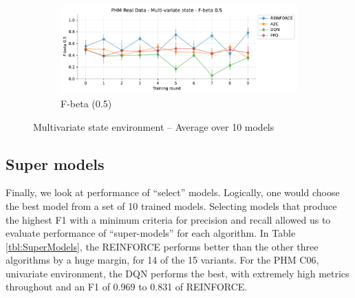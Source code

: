 \documentclass[a4paper, 12pt]{article}
\begin{document}
\begin{figure}[ht]
	\begin{subfigure}{\textwidth}
		\centering
		\includegraphics[width=\linewidth]{Multivariate_F05.pdf}  
		\caption{F-beta (0.5)}
		\label{fig:tr-ms-f05}
	\end{subfigure}
	\caption{Multivariate state environment -- Average over 10 models}
	\label{fig:tr-ms-env}
\end{figure}

\subsection{Super models}
Finally, we look at performance of ``select'' models. Logically, one would choose the best model from a set of 10 trained models. Selecting models that produce the highest F1 with a minimum criteria for precision and recall allowed us to evaluate performance of ``super-models'' for each algorithm. In Table \ref{tbl:SuperModels}, the REINFORCE performs better than the other three algorithms by a huge margin, for 14 of the 15 variants. For the PHM C06, univariate environment, the DQN performs the best, with extremely high metrics throughout and an F1 of 0.969 to 0.831 of REINFORCE.
\end{document}
